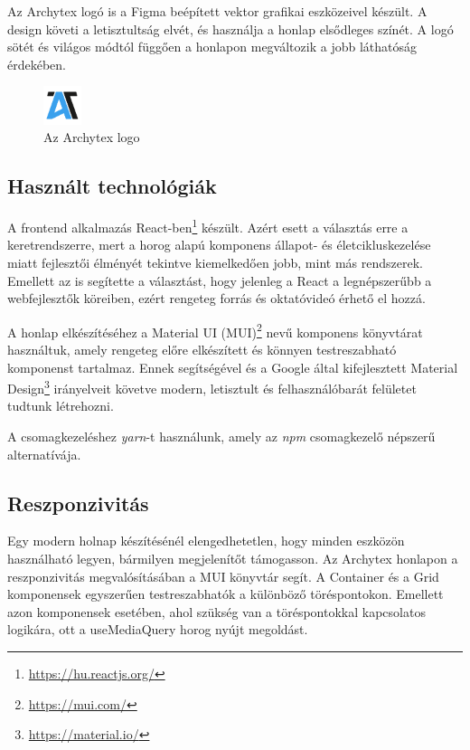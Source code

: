 Az Archytex logó is a Figma beépített vektor grafikai eszközeivel készült. A design követi a letisztultság elvét, és használja a honlap elsődleges színét. A logó sötét és világos módtól függően a honlapon megváltozik a jobb láthatóság érdekében.

\begin{figure}[h]
  \centering
  \includegraphics[width=0.1\textwidth]{parts/developer-documentation/frontend/images/logo.png}
  \caption{Az Archytex logo}
\end{figure}

\subsection{Használt technológiák}
A frontend alkalmazás React-ben\footnote{\url{https://hu.reactjs.org/}} készült. Azért esett a választás erre a keretrendszerre, mert a horog alapú komponens állapot- és életcikluskezelése miatt fejlesztői élményét tekintve kiemelkedően jobb, mint más rendszerek. Emellett az is segítette a választást, hogy jelenleg a React a legnépszerűbb a webfejlesztők köreiben\cite{most-used-web-frameworks}, ezért rengeteg forrás és oktatóvideó érhető el hozzá.

A honlap elkészítéséhez a Material UI (MUI)\footnote{\url{https://mui.com/}} nevű komponens könyvtárat használtuk, amely rengeteg előre elkészített és könnyen testreszabható komponenst tartalmaz. Ennek segítségével és a Google által kifejlesztett Material Design\footnote{\url{https://material.io/}} irányelveit követve modern, letisztult és felhasználóbarát felületet tudtunk létrehozni.

A csomagkezeléshez \emph{yarn}-t használunk, amely az \emph{npm} csomagkezelő népszerű alternatívája.

\subsection{Reszponzivitás}
Egy modern holnap készítésénél elengedhetetlen, hogy minden eszközön használható legyen, bármilyen megjelenítőt támogasson. Az Archytex honlapon a reszponzivitás megvalósításában a MUI könyvtár segít. A Container és a Grid komponensek egyszerűen testreszabhatók a különböző töréspontokon. Emellett azon komponensek esetében, ahol szükség van a töréspontokkal kapcsolatos logikára, ott a useMediaQuery horog nyújt megoldást.

